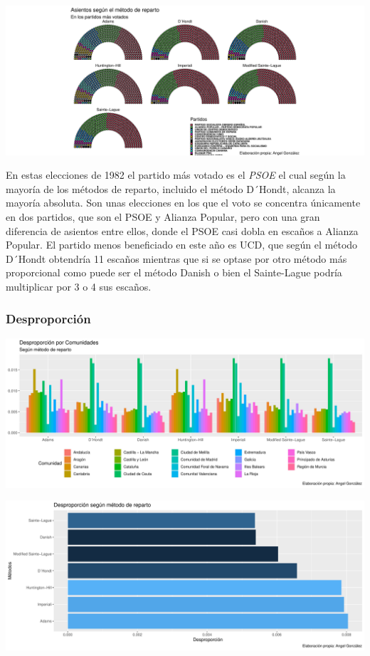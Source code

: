 \documentclass[12pt,a4paper,]{book}
\numberwithin{dummy}{section}
\theoremstyle{ocrenumbox}
\theoremstyle{blacknumex}
\theoremstyle{blacknumbox}
\theoremstyle{ocrenum}
\theoremstyle{ocrenum}
\begin{document}
\begin{center}\includegraphics[width=0.95\linewidth]{figurasR/unnamed-chunk-77-3} \end{center}

En estas elecciones de 1982 el partido más votado es el \emph{PSOE} el
cual según la mayoría de los métodos de reparto, incluido el método
D´Hondt, alcanza la mayoría absoluta. Son unas elecciones en los que el
voto se concentra únicamente en dos partidos, que son el PSOE y Alianza
Popular, pero con una gran diferencia de asientos entre ellos, donde el
PSOE casi dobla en escaños a Alianza Popular. El partido menos
beneficiado en este año es UCD, que según el método D´Hondt obtendría 11
escaños mientras que si se optase por otro método más proporcional como
puede ser el método Danish o bien el Sainte-Lague podría multiplicar por
3 o 4 sus escaños.

\hypertarget{desproporciuxf3n-2}{%
\subsubsection{Desproporción}\label{desproporciuxf3n-2}}

\begin{center}\includegraphics[width=0.95\linewidth]{figurasR/unnamed-chunk-78-1} \end{center}

\begin{center}\includegraphics[width=0.95\linewidth]{figurasR/unnamed-chunk-78-2} \end{center}
\end{document}
